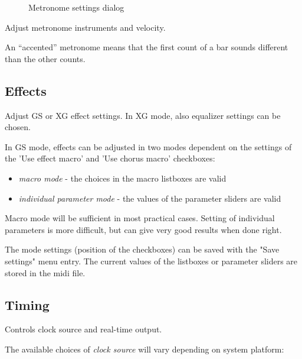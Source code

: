 \documentclass[letterpaper]{report}
\begin{document}
\begin{figure}%
%
%
\caption{Metronome settings dialog}%
\end{figure}

Adjust metronome instruments and velocity.

An ``accented'' metronome means that the first count of a bar sounds different
than the other counts.

\subsection{Effects}

Adjust GS or XG effect settings. In XG mode, also equalizer settings can be
chosen.

In GS mode, effects can be adjusted in two modes dependent on the settings
of the 'Use effect macro' and 'Use chorus macro' checkboxes:
\begin{itemize}
\item {\em macro mode} - the choices in the macro listboxes are valid
\item {\em individual parameter mode} - the values of the parameter
sliders are valid
\end{itemize}

Macro mode will be sufficient in most practical cases. Setting of individual
parameters is more difficult, but can give very good results when done right.

The mode settings (position of the checkboxes) can be saved with the
"Save settings" menu entry. The current values of the listboxes or parameter
sliders are stored in the midi file.

\subsection{Timing}

Controls clock source and real-time output.

The available choices of {\em clock source} will vary depending on system
platform:
\end{document}
